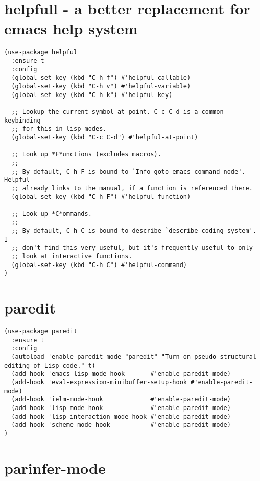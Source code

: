 \documentclass[11pt]{article}
\begin{document}
\section*{helpfull - a better replacement for emacs help system}
\label{sec:org07d39a4}

\begin{verbatim}
(use-package helpful
  :ensure t
  :config
  (global-set-key (kbd "C-h f") #'helpful-callable)
  (global-set-key (kbd "C-h v") #'helpful-variable)
  (global-set-key (kbd "C-h k") #'helpful-key)

  ;; Lookup the current symbol at point. C-c C-d is a common keybinding
  ;; for this in lisp modes.
  (global-set-key (kbd "C-c C-d") #'helpful-at-point)

  ;; Look up *F*unctions (excludes macros).
  ;;
  ;; By default, C-h F is bound to `Info-goto-emacs-command-node'. Helpful
  ;; already links to the manual, if a function is referenced there.
  (global-set-key (kbd "C-h F") #'helpful-function)

  ;; Look up *C*ommands.
  ;;
  ;; By default, C-h C is bound to describe `describe-coding-system'. I
  ;; don't find this very useful, but it's frequently useful to only
  ;; look at interactive functions.
  (global-set-key (kbd "C-h C") #'helpful-command)
)
\end{verbatim}
\section*{paredit}
\label{sec:orgebe15b5}

\begin{verbatim}
(use-package paredit
  :ensure t
  :config
  (autoload 'enable-paredit-mode "paredit" "Turn on pseudo-structural editing of Lisp code." t)
  (add-hook 'emacs-lisp-mode-hook       #'enable-paredit-mode)
  (add-hook 'eval-expression-minibuffer-setup-hook #'enable-paredit-mode)
  (add-hook 'ielm-mode-hook             #'enable-paredit-mode)
  (add-hook 'lisp-mode-hook             #'enable-paredit-mode)
  (add-hook 'lisp-interaction-mode-hook #'enable-paredit-mode)
  (add-hook 'scheme-mode-hook           #'enable-paredit-mode)
)
\end{verbatim}



\section*{parinfer-mode}
\label{sec:orgbc15cbd}
\end{document}
